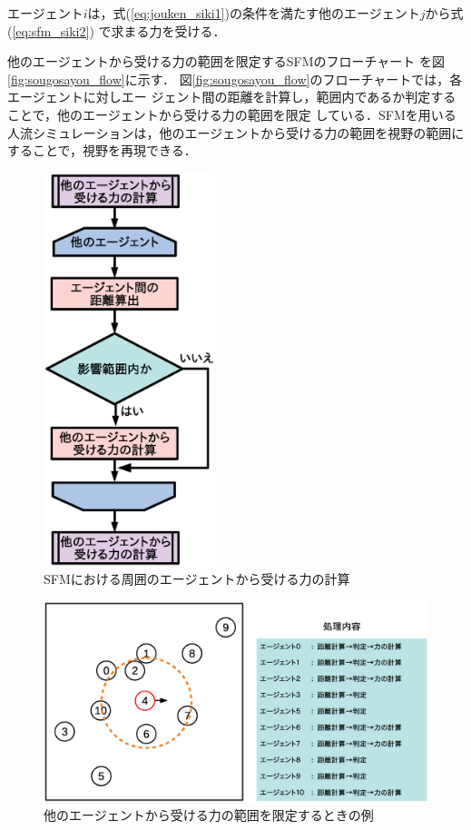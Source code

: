 エージェント$i$は，式(\ref{eq:jouken_siki1})の条件を満たす他のエージェント$j$から式(\ref{eq:sfm_siki2})
で求まる力を受ける．

他のエージェントから受ける力の範囲を限定するSFMのフローチャート
を図\ref{fig:sougosayou_flow}に示す．
図\ref{fig:sougosayou_flow}のフローチャートでは，各エージェントに対しエー
ジェント間の距離を計算し，範囲内であるか判定することで，他のエージェントから受ける力の範囲を限定
している．SFMを用いる人流シミュレーションは，他のエージェントから受ける力の範囲を視野の範囲に
することで，視野を再現できる．

\begin{figure}[t]
 \begin{center}
  \includegraphics[width=5cm,clip]{figure/agent_flow.eps}
  \caption{SFMにおける周囲のエージェントから受ける力の計算}
  \label{fig:sougo_hani_flow}
 \end{center}
\end{figure}



\begin{figure}[h]
 \begin{center}
  \includegraphics[width=11.5cm,clip]{figure/sougo_hani_image_r2.eps}
  \caption{他のエージェントから受ける力の範囲を限定するときの例}
  \label{fig:sougo_hani}
 \end{center}
\end{figure}


